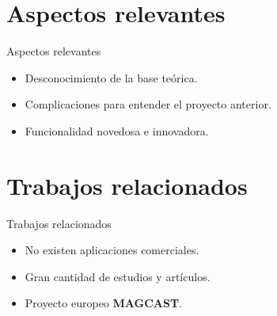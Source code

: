 \documentclass[10pt]{beamer}
\begin{document}
\section{Aspectos relevantes}
\begin{frame}{Aspectos relevantes}
\begin{itemize}
\item \alert{Desconocimiento} de la base teórica.\newline


\item \alert{Complicaciones} para entender el proyecto anterior.\newline


\item Funcionalidad \alert{novedosa} e \alert{innovadora}.
\end{itemize}
\end{frame}


\section{Trabajos relacionados}
\begin{frame}{Trabajos relacionados}
\begin{itemize}
\item No existen aplicaciones comerciales.\newline


\item Gran cantidad de estudios y artículos.\newline


\item Proyecto europeo \textbf{MAGCAST}.
\end{itemize}
\end{frame}
\end{document}

